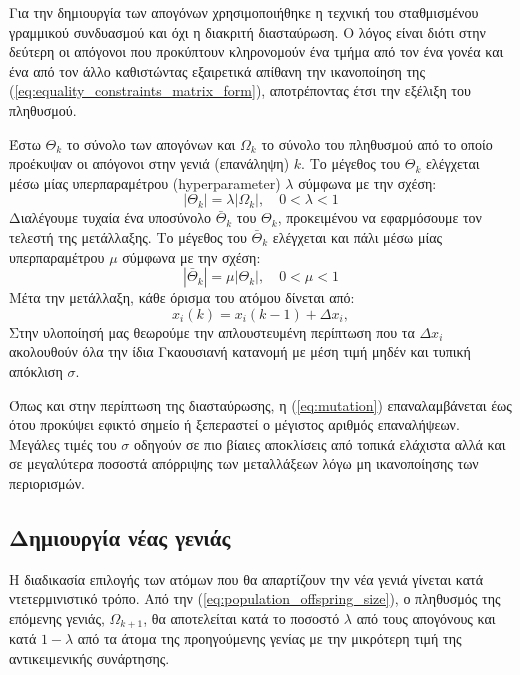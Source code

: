 \documentclass[a4paper,12pt]{article}
\begin{document}
Για την δημιουργία των απογόνων χρησιμοποιήθηκε η τεχνική του σταθμισμένου γραμμικού συνδυασμού και όχι η διακριτή
διασταύρωση. Ο λόγος είναι διότι στην δεύτερη οι απόγονοι που προκύπτουν κληρονομούν ένα τμήμα από τον ένα γονέα
και ένα από τον άλλο καθιστώντας εξαιρετικά απίθανη την ικανοποίηση της (\ref{eq:equality_constraints_matrix_form}),
αποτρέποντας έτσι την εξέλιξη του πληθυσμού.

Έστω $\Theta_k$ το σύνολο των απογόνων και $\Omega_k$ το σύνολο του πληθυσμού από το οποίο προέκυψαν οι απόγονοι
στην γενιά (επανάληψη) $k$. Το μέγεθος του $\Theta_k$ ελέγχεται μέσω μίας υπερπαραμέτρου 
(hyperparameter) $\lambda$ σύμφωνα με την σχέση:
\begin{equation}
    |\Theta_k| = \lambda |\Omega_k|, \quad 0 < \lambda < 1
    \label{eq:population_offspring_size}
\end{equation}
Διαλέγουμε τυχαία ένα υποσύνολο $\bar{\Theta}_k$ του $\Theta_k$, 
προκειμένου να εφαρμόσουμε τον τελεστή της μετάλλαξης. Το μέγεθος του $\bar{\Theta}_k$ ελέγχεται και πάλι μέσω μίας
υπερπαραμέτρου $\mu$ σύμφωνα με την σχέση:
\begin{equation}
    |\bar{\Theta}_k| = \mu |\Theta_k|, \quad 0 < \mu < 1
    \label{eq:offspring_mutation_size}
\end{equation}
Μέτα την μετάλλαξη, κάθε όρισμα του ατόμου δίνεται από:
\begin{equation}
    x_i(k) = x_i(k-1) + \Delta x_i,
    \label{eq:mutation}
\end{equation}
Στην υλοποίησή μας θεωρούμε την απλουστευμένη περίπτωση που τα $\Delta x_i$ ακολουθούν όλα την ίδια Γκαουσιανή 
κατανομή με μέση τιμή μηδέν και τυπική απόκλιση $\sigma$. 

Όπως και στην περίπτωση της διασταύρωσης, η (\ref{eq:mutation}) επαναλαμβάνεται έως ότου προκύψει εφικτό σημείο
ή ξεπεραστεί ο μέγιστος αριθμός επαναλήψεων. Μεγάλες τιμές του $\sigma$ οδηγούν σε πιο βίαιες αποκλίσεις από
τοπικά ελάχιστα αλλά και σε μεγαλύτερα ποσοστά απόρριψης των μεταλλάξεων λόγω μη ικανοποίησης των περιορισμών.

\subsection{Δημιουργία νέας γενιάς}
Η διαδικασία επιλογής των ατόμων που θα απαρτίζουν την νέα γενιά γίνεται κατά ντετερμινιστικό τρόπο. Από την
(\ref{eq:population_offspring_size}), ο πληθυσμός της επόμενης γενιάς, $\Omega_{k+1}$, θα αποτελείται κατά το
ποσοστό $\lambda$ από τους απογόνους και κατά $1 - \lambda$ από τα άτομα της προηγούμενης γενίας με την μικρότερη
τιμή της αντικειμενικής συνάρτησης.
\end{document}
